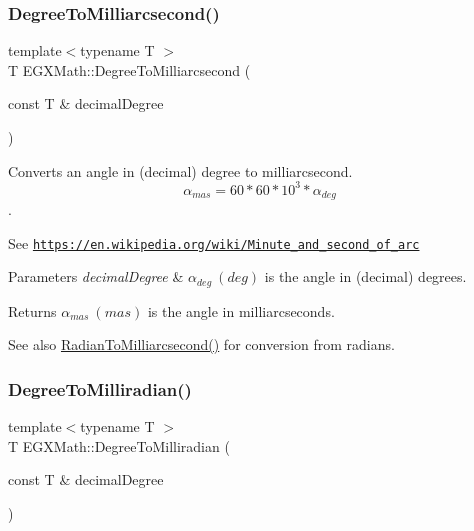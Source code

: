 \subsubsection{\texorpdfstring{Degree\+To\+Milliarcsecond()}{DegreeToMilliarcsecond()}}
{\footnotesize\ttfamily template$<$typename T $>$ \\
T E\+G\+X\+Math\+::\+Degree\+To\+Milliarcsecond (\begin{DoxyParamCaption}\item[{const T \&}]{decimal\+Degree }\end{DoxyParamCaption})}



Converts an angle in (decimal) degree to milliarcsecond. \[\alpha_{mas}=60 * 60 * 10^3 * \alpha_{deg} \]. 

See \href{https://en.wikipedia.org/wiki/Minute_and_second_of_arc}{\tt https\+://en.\+wikipedia.\+org/wiki/\+Minute\+\_\+and\+\_\+second\+\_\+of\+\_\+arc} 
\begin{DoxyParams}{Parameters}
{\em decimal\+Degree} & $\alpha_{deg}\ (deg)$ is the angle in (decimal) degrees. \\
\hline
\end{DoxyParams}
\begin{DoxyReturn}{Returns}
$\alpha_{mas}\ (mas)$ is the angle in milliarcseconds. 
\end{DoxyReturn}
\begin{DoxySeeAlso}{See also}
\mbox{\hyperlink{group___e_g_x_math-_angle_conversions-_radian_ga84fbb494a455cfeb30be62776f96c9a9}{Radian\+To\+Milliarcsecond()}} for conversion from radians. 
\end{DoxySeeAlso}
\mbox{\label{group___e_g_x_math-_angle_conversions-_degree_gae4fa6c2d3805430760783650cfbfdb11}} 
\subsubsection{\texorpdfstring{Degree\+To\+Milliradian()}{DegreeToMilliradian()}}
{\footnotesize\ttfamily template$<$typename T $>$ \\
T E\+G\+X\+Math\+::\+Degree\+To\+Milliradian (\begin{DoxyParamCaption}\item[{const T \&}]{decimal\+Degree }\end{DoxyParamCaption})}



